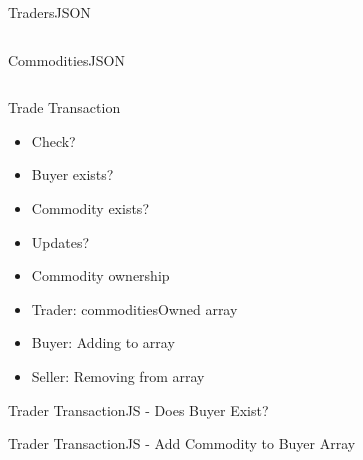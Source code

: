 \documentclass[pdf,table]{beamer}
\begin{document}
	
\begin{frame}{Traders}{JSON}
	\begin{columns}[T]
		\begin{column}{0.44\textwidth}
			
		\end{column}
		\begin{column}{0.44\textwidth}
			
		\end{column}
	\end{columns}	
\end{frame}

\begin{frame}{Commodities}{JSON}
	\begin{columns}[T]
		\begin{column}{0.44\textwidth}
			
		\end{column}
		\begin{column}{0.44\textwidth}
			
		\end{column}
	\end{columns}	
\end{frame}

\begin{frame}{Trade Transaction}
	\begin{itemize}
		\item Check?
		\item<2-> Buyer exists?
		\item<2-> Commodity exists?
		\item<2-> Updates?
		\item<3-> Commodity ownership
		\item<3-> Trader: commoditiesOwned array
		\item<4-> Buyer: Adding to array
		\item<4-> Seller: Removing from array
	\end{itemize}
\end{frame}

\begin{frame}{Trader Transaction}{JS - Does Buyer Exist?}
	
\end{frame}

\begin{frame}{Trader Transaction}{JS - Add Commodity to Buyer Array}
	
\end{frame}
\end{document}
